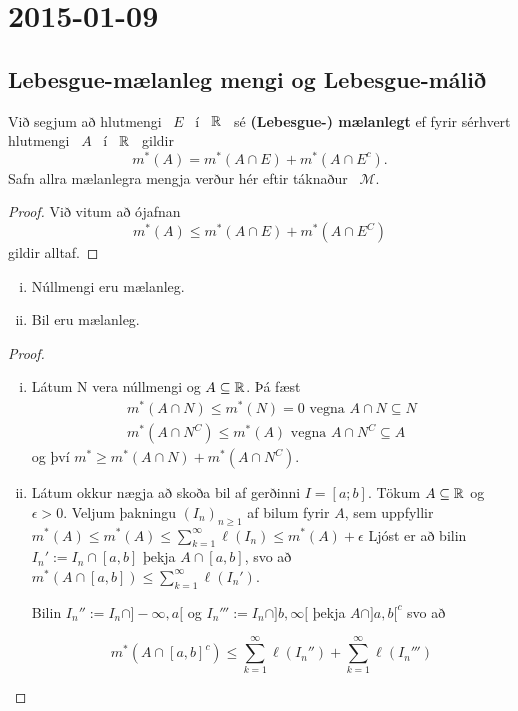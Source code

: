 \documentclass[12pt]{report}
\begin{document}
\chapter{2015-01-09}

\section{Lebesgue-mælanleg mengi og Lebesgue-málið}

\begin{skgr*}
Við segjum að hlutmengi \ $E$ \ í \ $\mathbb{R}$ \ sé {\bf (Lebesgue-) mælanlegt} ef fyrir sérhvert hlutmengi \ $A$ \ í \ $\mathbb{R}$ \ gildir
\[
m^*(A) = m^*(A\cap E) + m^*(A\cap E^c).
\]
Safn allra mælanlegra mengja verður hér eftir táknaður \ $\mathcal{M}$.
\end{skgr*}
\begin{proof}
  Við vitum að ójafnan
  \[m^*(A) \leq m^*(A \cap E) + m^*(A \cap E^C) \] gildir alltaf.

\end{proof}


\begin{setn*}\leavevmode
\begin{enumerate}[(i)]
\item
Núllmengi eru mælanleg.
\item
Bil eru mælanleg.
\end{enumerate}
\end{setn*}
\begin{proof}
  \begin{enumerate}[(i)]
  \item Látum N vera núllmengi og $A \subseteq \mathbb{R}$. Þá fæst
    \begin{gather*}
      m^*(A\cap N) \leq m^*(N) = 0 \text{ vegna } A \cap N \subseteq N \\
      m^*(A \cap N^C) \leq m^*(A) \text{ vegna } A \cap N^C
      \subseteq A
    \end{gather*}
    og því $m^* \geq m^*(A \cap N) + m^*(A\cap N^C)$.


  \item Látum okkur nægja að skoða bil af gerðinni $I =
    [a;b]$.
    Tökum $A \subseteq \mathbb{R}$ og $\epsilon > 0$. Veljum þakningu
    $(I_n)_{n\geq 1}$ af bilum fyrir $A$, sem uppfyllir
    $m^*(A) \leq m^*(A) \leq \sum_{k=1}^{\infty} \ell(I_n) \leq
    m^*(A) + \epsilon$
    Ljóst er að bilin $I_n' := I_n \cap [a,b]$ þekja
    $A \cap [a,b]$, svo að
    $m^*(A \cap [a,b]) \leq \sum_{k=1}^{\infty} \ell(I_n')$.

    Bilin $I_n'' := I_n \cap ]- \infty, a[$ og
    $I_n''' := I_n \cap ]b, \infty [ $ þekja $A \cap ]a,b[^c$ svo
    að

    \[ m^*(A \cap [a,b]^c) \leq \sum_{k=1}^{\infty} \ell(I_n'') +
    \sum_{k=1}^{\infty} \ell(I_n''') \]
  \end{enumerate}

\end{proof}
\end{document}
